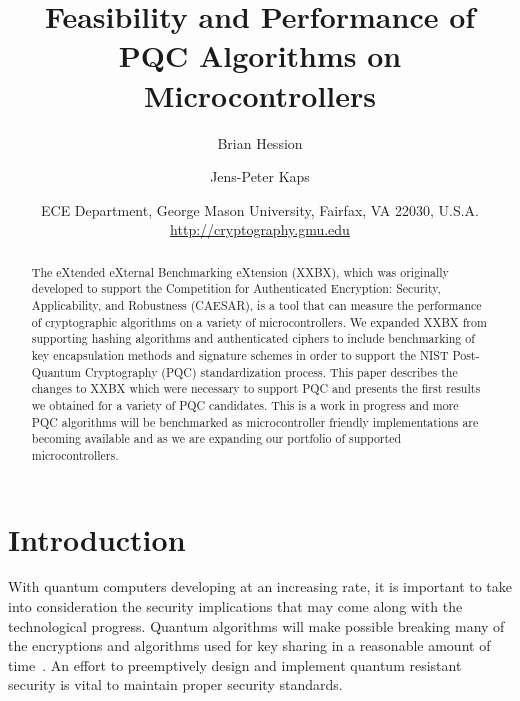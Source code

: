 \documentclass[10pt]{article}
\begin{document}
\title{Feasibility and Performance of PQC Algorithms on Microcontrollers %
} 

\author{Brian Hession \and Jens-Peter Kaps}

\date{ECE Department, George Mason University, Fairfax, VA 22030, U.S.A.\\
\url{http://cryptography.gmu.edu}}%

\maketitle

\begin{abstract}
The eXtended eXternal Benchmarking eXtension (XXBX), which was originally developed
to support the Competition for Authenticated Encryption: Security, Applicability, 
and Robustness (CAESAR), is a tool that can measure the performance of cryptographic 
algorithms on a variety of microcontrollers. We expanded XXBX from supporting 
hashing algorithms and authenticated ciphers to include benchmarking of key encapsulation 
methods and signature schemes in order to support the NIST Post-Quantum
Cryptography (PQC) standardization process. 
This paper describes the changes to XXBX which were necessary to support PQC and 
presents the first results we obtained for a variety of PQC candidates.
This is a work in progress and more PQC algorithms will be benchmarked as 
microcontroller friendly implementations are becoming available and as we are 
expanding our portfolio of supported microcontrollers.
\end{abstract}


\section{Introduction}

With quantum computers developing at an increasing rate, it is important to take into 
consideration the security implications that may come along with the technological progress. 
Quantum algorithms will make possible breaking many of the encryptions and algorithms used for 
key sharing in a reasonable amount of time~\cite{nsareco}.
An effort to preemptively design and implement 
quantum resistant security is vital to maintain proper security standards.
\end{document}
